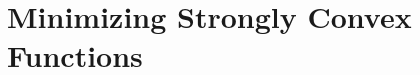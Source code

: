 \documentclass[openany]{book}
\theoremstyle{definition}
\theoremstyle{remark}
\begin{document}
\section{Minimizing Strongly Convex Functions}\label{sec:GDStrConv}
\begin{comment}
In this subsection, we will consider strongly convex functions. Using this additional assumption, the upper bound and lower bound construction will be different.

For lower bound, let $\underline{f}_t(x)=f(x^{(t)})+\langle\nabla f(x^{(t)}),x-x^{(t)}\rangle+\frac{\alpha}{2}\|x-x^{(t)}\|_2^2$, and $\underline{f}=\sup_{0\le t\le T-1}\underline{f}_t$. Since the supreme of $\alpha$-strongly convex functions is still $\alpha$-strongly convex, we know that $\underline{f}$ is the best lower bound of $f$ we have after $T$ steps, in the sense that it shares with $f$ common function values and (sub)gradients at $x^{(0)},\ldots,x^{(T-1)}$ and is $\alpha$-strongly convex, and is the minimum of all such functions which satisfy those properties.

Now we want to construct a corresponding upper bound. As before, for $\le t\le T-1$, let $\overline{f}_t(x^{(t)})=f(x^{(t)})$, while $\overline{f}_t(x)=\infty$ for $x\ne x^{(t)}$. Now let $\overline{f}(x)=\left(\mathbf{conv}\,\left(\inf_{0\le t\le T-1}\overline{f}_t(x)-q(x)\right)\right)+q(x)$, where $q(x)=\frac{\alpha}{2}\|x\|_2^2+\langle b,x\rangle+c$ and $b,c$ are arbitrary. Different $q$ will not affect $\overline{f}$ since $\overline{f}$ is the maximum $\alpha$-strongly convex function less than or equal $\inf_{0\le t\le T-1}\overline{f}_t(x)$, which is unique. Specifically, we can let $q(x)=\underline{f}_t(x)$, and then we can see $\overline{f}(x^{(t)})=f(x^{(t)})$, and $\nabla f(x^{(t)})\in\partial \overline{f}(x^{(t)})$. As a result, $\overline{f}$ is the best upper bound we have after $T$ steps.

Since strong convexity ensures the existence of optimum, it is natural to use $x^{\star}$ as the benchmark; however, we still state bounds w.r.t. a general reference point $x$. Since $\overline{f}$ still equals $+\infty$ outside $\mathbf{conv}\,\{x^{(0)},x^{(T-1)}\}$, the output $\tilde{x}$ should still be in this convex hull.


\end{comment}
\end{document}
